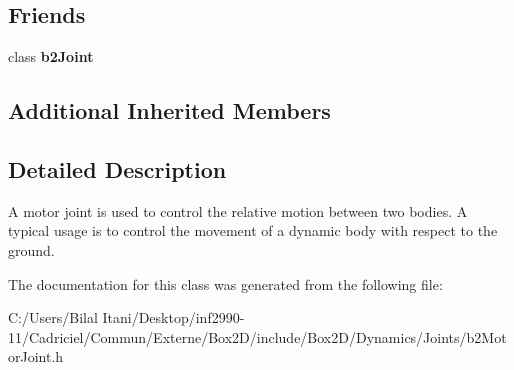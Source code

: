 \subsection*{Friends}
\begin{DoxyCompactItemize}
\item 
class {\bfseries b2\+Joint}\hypertarget{classb2_motor_joint_a54ade8ed3d794298108d7f4c4e4793fa}{}\label{classb2_motor_joint_a54ade8ed3d794298108d7f4c4e4793fa}

\end{DoxyCompactItemize}
\subsection*{Additional Inherited Members}


\subsection{Detailed Description}
A motor joint is used to control the relative motion between two bodies. A typical usage is to control the movement of a dynamic body with respect to the ground. 

The documentation for this class was generated from the following file\+:\begin{DoxyCompactItemize}
\item 
C\+:/\+Users/\+Bilal Itani/\+Desktop/inf2990-\/11/\+Cadriciel/\+Commun/\+Externe/\+Box2\+D/include/\+Box2\+D/\+Dynamics/\+Joints/b2\+Motor\+Joint.\+h\end{DoxyCompactItemize}
